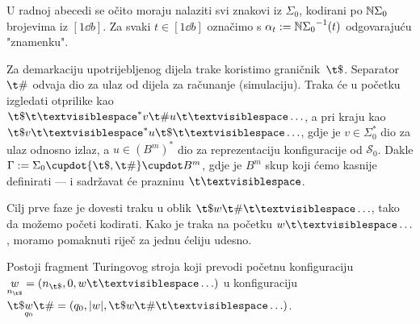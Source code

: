 U radnoj abecedi se očito moraju nalaziti svi znakovi iz $\Sigma_0$, kodirani po ${\mathbb N}\Sigma_0$ brojevima iz $[1\dd b]$. Za svaki $t\in[1\dd b]$ označimo s $\alpha_t:={{\mathbb N}\Sigma_0}^{-1}(t)$ odgovarajuću "znamenku".  %

Za demarkaciju upotrijebljenog dijela trake koristimo graničnik~$\t\$$. Separator~$\t\#$ odvaja dio za ulaz od dijela za računanje (simulaciju). Traka će u početku izgledati otprilike kao $\t\$\bl^*v\t\#u\bl\ldots$, a pri kraju kao $\t\$v\bl^*u\t\$\bl\ldots$, gdje je $v\in\Sigma_0^*$ dio za ulaz odnosno izlaz, a $u\in(B^m)^*$ dio za reprezentaciju konfiguracije od $\mathcal S_0$. Dakle
    $\Gamma:=\Sigma_0\dcup\{\t\$,\t\#\}\dcup B^m$,
gdje je $B^m$ skup koji ćemo kasnije definirati --- i sadržavat će prazninu $\bl$.


Cilj prve faze je dovesti traku u oblik $\t\$w\t\#\bl\ldots$, tako da možemo početi kodirati. Kako je traka na početku $w\bl\ldots$, moramo pomaknuti riječ za jednu ćeliju udesno.

\begin{lema}[{name=[prvi fragment transpiliranog stroja]}]\label{lm:faza1}
    Postoji fragment Turingovog stroja koji prevodi početnu konfiguraciju $\underset{n_{\t\$}}{w}=(n_{\t\$},0,w\bl\ldots)$ u konfiguraciju $\t\$\underset{q_0}{w}\t\#=(q_0,\dulj{w},\t\$w\t\#\bl\ldots)$.
\vspace{-6pt}
\end{lema}

